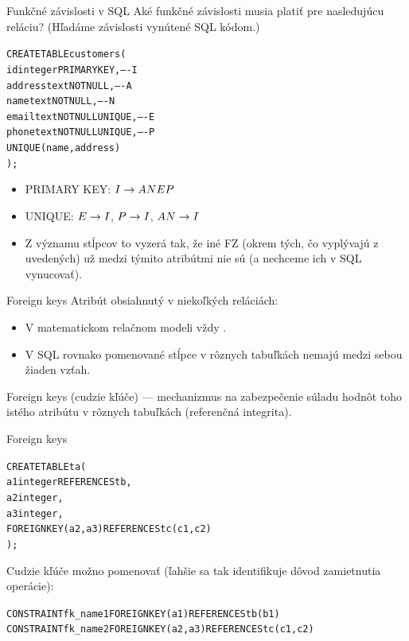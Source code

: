\documentclass[12pt]{beamer}
\begin{document}
\begin{frame}[fragile]{Funkčné závislosti v SQL}
Aké funkčné závislosti musia platiť pre nasledujúcu reláciu? (Hľadáme závislosti vynútené SQL kódom.)
\begin{alltt}
    CREATE TABLE customers (
        id        integer PRIMARY KEY,     ---- I
        address   text NOT NULL,           ---- A
        name      text NOT NULL,           ---- N
        email     text NOT NULL UNIQUE,    ---- E
        phone     text NOT NULL UNIQUE,    ---- P
        UNIQUE(name, address)
    );
\end{alltt}
\pause
\begin{itemize}
\item PRIMARY KEY: $I\rightarrow ANEP$
\item UNIQUE: $E\rightarrow I$, $P\rightarrow I$, $AN\rightarrow I$
\item Z významu stĺpcov to vyzerá tak, že iné FZ (okrem tých, čo vyplývajú z uvedených) už medzi týmito atribútmi nie sú (a nechceme ich v SQL vynucovať).
\end{itemize}
\end{frame}


\begin{frame}[fragile]{Foreign keys}
Atribút obsiahnutý v niekoľkých reláciách:
\begin{itemize}
\item V matematickom relačnom modeli vždy .
\item V SQL rovnako pomenované stĺpce v rôznych tabuľkách nemajú medzi sebou žiaden vzťah.
\end{itemize}
\alert{Foreign keys} (cudzie kľúče) --- mechanizmus na zabezpečenie súladu hodnôt toho istého atribútu v rôznych tabuľkách (referenčná integrita).
\end{frame}

\begin{frame}[fragile]{Foreign keys}
\begin{alltt}
CREATE TABLE ta (
  a1 integer \alert{REFERENCES tb},
  a2 integer,
  a3 integer,
  \alert{FOREIGN KEY (a2, a3) REFERENCES tc (c1, c2)}
);
\end{alltt}
Cudzie kľúče možno pomenovať (ľahšie sa tak identifikuje dôvod zamietnutia operácie):
{\scriptsize
\begin{alltt}
  CONSTRAINT fk_name1 FOREIGN KEY (a1) REFERENCES tb (b1)
  CONSTRAINT fk_name2 FOREIGN KEY (a2, a3) REFERENCES tc (c1, c2)
\end{alltt}
}
\end{frame}
\end{document}

